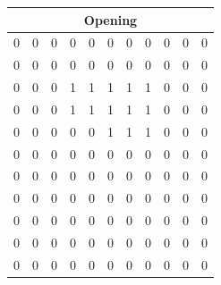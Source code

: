 \documentclass{article}
\begin{document}
\begin{enumerate}
    \begin{center}
        \begin{tabular}{|c|c|c|c|c|c|c|c|c|c|c|}
        \multicolumn{11}{c}{\textbf{Opening}} \\
        \hline
        0 & 0 & 0 & 0 & 0 & 0 & 0 & 0 & 0 & 0 & 0 \\
        \hline
        0 & 0 & 0 & 0 & 0 & 0 & 0 & 0 & 0 & 0 & 0 \\
        \hline
        0 & 0 & 0 & \cellcolor{blue!20}1 & \cellcolor{blue!20}1 & \cellcolor{blue!20}1 & \cellcolor{blue!20}1 & \cellcolor{blue!20}1 & 0 & 0 & 0 \\
        \hline
        0 & 0 & 0 & \cellcolor{blue!20}1 & \cellcolor{blue!20}1 & \cellcolor{blue!20}1 & \cellcolor{blue!20}1 & \cellcolor{blue!20}1 & 0 & 0 & 0 \\
        \hline
        0 & 0 & 0 & 0 & 0 & \cellcolor{blue!20}1 & \cellcolor{blue!20}1 & \cellcolor{blue!20}1 & 0 & 0 & 0 \\
        \hline
        0 & 0 & 0 & 0 & 0 & 0 & 0 & 0 & 0 & 0 & 0 \\
        \hline
        0 & 0 & 0 & 0 & 0 & 0 & 0 & 0 & 0 & 0 & 0 \\
        \hline
        0 & 0 & 0 & 0 & 0 & 0 & 0 & 0 & 0 & 0 & 0 \\
        \hline
        0 & 0 & 0 & 0 & 0 & 0 & 0 & 0 & 0 & 0 & 0 \\
        \hline
        0 & 0 & 0 & 0 & 0 & 0 & 0 & 0 & 0 & 0 & 0 \\
        \hline
        0 & 0 & 0 & 0 & 0 & 0 & 0 & 0 & 0 & 0 & 0 \\
        \hline
        \end{tabular}
    \end{center}


\end{enumerate}
\end{document}
